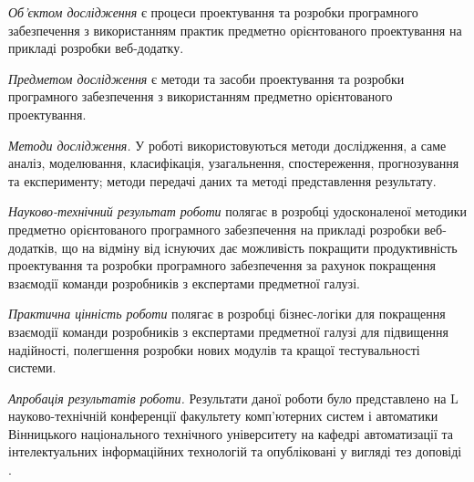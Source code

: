 \emph{Об'єктом дослідження} є процеси проектування та розробки
програмного забезпечення з використанням практик 
предметно орієнтованого проектування на прикладі розробки веб-додатку.

\emph{Предметом дослідження} є методи та засоби проектування та
розробки програмного забезпечення з використанням предметно орієнтованого проектування.

\emph{Методи дослідження.} У роботі використовуються методи дослідження, а
саме аналіз, моделювання, класифікація, узагальнення, спостереження,
прогнозування та експерименту; методи передачі даних та методі
представлення результату.

\emph{Науково-технічний результат роботи} полягає в розробці удосконаленої
методики предметно орієнтованого програмного забезпечення на прикладі
розробки веб-додатків, що на відміну від існуючих дає можливість
покращити продуктивність проектування та розробки програмного 
забезпечення за рахунок покращення взаємодії команди розробників
з експертами предметної галузі. 

\emph{Практична цінність роботи} полягає в розробці бізнес-логіки
для покращення взаємодії команди розробників з експертами
предметної галузі для підвищення надійності, полегшення розробки
нових модулів та кращої тестувальності системи.

\emph{Апробація результатів роботи.} Результати даної роботи було
представлено на L науково-технічній конференції
факультету комп’ютерних систем і автоматики 
Вінницького національного технічного університету на
кафедрі автоматизації та інтелектуальних інформаційних технологій
та опубліковані у вигляді тез доповіді \cite{thesis}.
